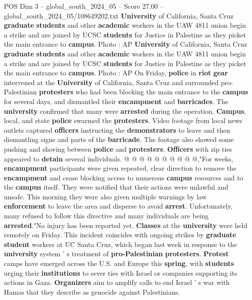 \begin{textsample}{POS Dim 3 – global\_south\_2024\_05 – Score 27.00 – global\_south\_2024\_05/108649202.txt}  \label{ex:f3_pos_097}
\textbf{University} of California, Santa Cruz \textbf{graduate} \textbf{students} and other \textbf{academic} workers in the UAW 4811 union begin a strike and are joined by UCSC \textbf{students} for Justice in Palestine as they picket the main entrance to \textbf{campus}.
Photo : AP \textbf{University} of California, Santa Cruz \textbf{graduate} \textbf{students} and other \textbf{academic} workers in the UAW 4811 union begin a strike and are joined by UCSC \textbf{students} for Justice in Palestine as they picket the main entrance to \textbf{campus}.
Photo : AP On Friday, \textbf{police} in \textbf{riot} \textbf{gear} intervened at the \textbf{University} of California, Santa Cruz and surrounded pro- Palestinian \textbf{protesters} who had been blocking the main entrance to the \textbf{campus} for several days, and dismantled their \textbf{encampment} and \textbf{barricades}.
The \textbf{university} confirmed that many were \textbf{arrested} during the operation. \textbf{Campus}, local, and state \textbf{police} swarmed the \textbf{protesters}.
Video footage from local news outlets captured \textbf{officers} instructing the \textbf{demonstrators} to leave and then dismantling signs and parts of the \textbf{barricade}.
The footage also showed some pushing and shoving between \textbf{police} and \textbf{protesters}. \textbf{Officers} with zip ties appeared to \textbf{detain} several individuals. @ @ @ @ @ @ @ @ @ @,"For weeks, \textbf{encampment} participants were given repeated, clear direction to remove the \textbf{encampment} and cease blocking access to numerous \textbf{campus} resources and to the \textbf{campus} itself.
They were notified that their actions were unlawful and unsafe.
This morning they were also given multiple warnings by law \textbf{enforcement} to leave the area and disperse to avoid \textbf{arrest}.
Unfortunately, many refused to follow this directive and many individuals are being \textbf{arrested}."No injury has been reported yet. \textbf{Classes} at the \textbf{university} were held remotely on Friday.
This incident coincides with ongoing strikes by \textbf{graduate} \textbf{student} workers at UC Santa Cruz, which began last week in response to the \textbf{university} system ' s treatment of \textbf{pro-Palestinian} \textbf{protesters}. \textbf{Protest} camps have emerged across the U.S. and Europe this \textbf{spring}, with \textbf{students} urging their \textbf{institutions} to sever ties with Israel or companies supporting its actions in Gaza. \textbf{Organizers} aim to amplify calls to end Israel ' s war with Hamas that they describe as genocide against Palestinians.

\end{textsample}
